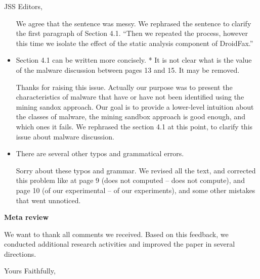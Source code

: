 \documentclass{letter}
\begin{document}
\begin{letter}{JSS Editors,}
\begin{itemize}
{\color{blue}{\bf Answer.} We agree that the sentence was messy. We rephrased the sentence to clarify the first paragraph of Section 4.1. ``Then we repeated the process, however this time we isolate the effect of the static analysis component of DroidFax.''}

\vspace{0.2cm}

\item Section 4.1 can be written more concisely.
* It is not clear what is the value of the malware discussion between pages 13 and 15. It may be removed.

\vspace{0.2cm}

{\color{blue}{\bf Answer.} Thanks for raising this issue. Actually our purpose was to present the characteristics of malware that have or have not been identified using the mining sandox approach. Our goal is to provide a lower-level intuition about the classes of malware, the mining sandbox approach is good enough, and which ones it fails. We rephrased the section 4.1 at this point, to clarify this issue about malware discussion.}

\vspace{0.2cm}

\item There are several other typos and grammatical errors.


\vspace{0.2cm}

{\color{blue}{\bf Answer.} Sorry about these typos and grammar. We revised all the text, and corrected this problem like at page 9 (does not computed – does not compute), and page 10 (of our experimental – of our experiments), and some other mistakes that went unnoticed.}





\end{itemize}



{\bf Meta review}

We want to thank all comments we received. Based on this feedback, we conducted additional research activities and improved the paper in several directions.

\closing{Yours Faithfully,}


\end{letter}
\end{document}
